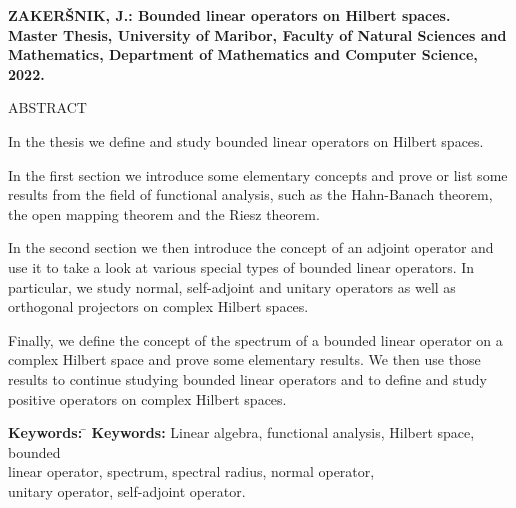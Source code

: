 \documentclass[12pt,a4paper,oneside,fleqn,openany]{book}
\begin{document}
\newpage
\textbf{ZAKERŠNIK, J.: Bounded linear operators on Hilbert spaces.\\
Master Thesis, University of Maribor, Faculty of Natural Sciences and \-Ma\-the\-ma\-tics,
Department of Mathematics and Computer Science, 2022.}\\


\vspace{1.5cm}

\large

ABSTRACT

\small

\vspace{1.5cm}
\begin{sloppypar}
	In the thesis we define and study bounded linear operators on Hilbert spaces.
\end{sloppypar}
\begin{sloppypar}
	In the first section we introduce some elementary concepts and prove or list some results from the field of functional analysis, such as the Hahn-Banach theorem, the open mapping theorem and the Riesz theorem.
\end{sloppypar}
\begin{sloppypar}
	In the second section we then introduce the concept of an adjoint operator and use it to take a look at various special types of bounded linear operators. In particular, we study normal, self-adjoint and unitary operators as well as orthogonal projectors on complex Hilbert spaces.
\end{sloppypar}
\begin{sloppypar}
	Finally, we define the concept of the spectrum of a bounded linear operator on a complex Hilbert space and prove some elementary results. We then use those results to continue studying bounded linear operators and to define and study positive operators on complex Hilbert spaces.
\end{sloppypar}


\vfill

\begin{tabbing}
\textbf{Keywords:} \=\kill
\textbf{Keywords:}  Linear algebra, functional analysis, Hilbert space, bounded \\
\>linear operator, spectrum, spectral radius, normal operator, \\
\>unitary operator, self-adjoint operator.
\end{tabbing}
\end{document}
